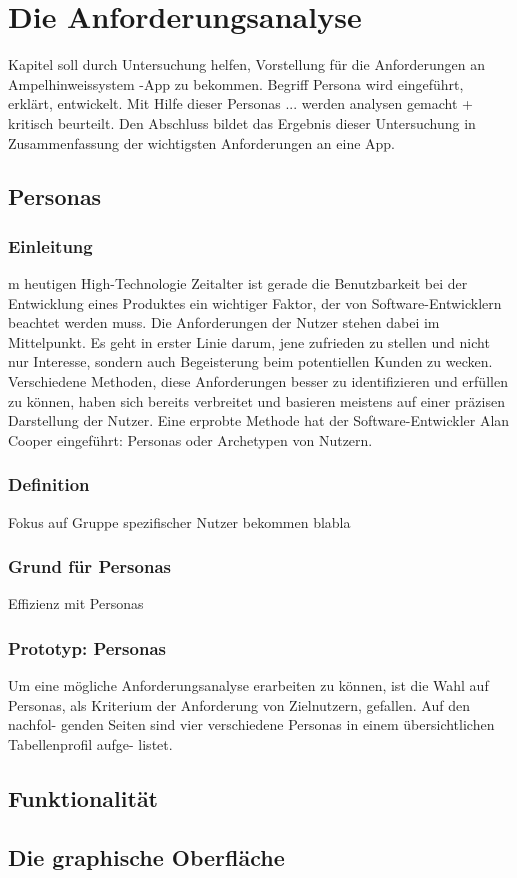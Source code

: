 \chapter{Die Anforderungsanalyse}
Kapitel soll durch Untersuchung helfen, Vorstellung für die Anforderungen an Ampelhinweissystem -App zu bekommen. Begriff Persona wird eingeführt, erklärt, entwickelt.
Mit Hilfe dieser Personas ... werden analysen gemacht + kritisch beurteilt.
Den Abschluss bildet das Ergebnis dieser Untersuchung in Zusammenfassung der wichtigsten Anforderungen an eine App.
\section{Personas}
\subsection{Einleitung}
m heutigen High-Technologie Zeitalter ist gerade die Benutzbarkeit bei der Entwicklung eines
Produktes ein wichtiger Faktor, der von Software-Entwicklern beachtet werden muss. Die Anforderungen der Nutzer stehen dabei im Mittelpunkt. Es geht in erster Linie darum, jene zufrieden zu stellen und nicht nur Interesse, sondern auch Begeisterung beim potentiellen Kunden zu wecken. Verschiedene Methoden, diese Anforderungen besser zu identifizieren und erfüllen zu können, haben sich bereits verbreitet und basieren meistens auf einer präzisen Darstellung der Nutzer. Eine erprobte Methode hat der Software-Entwickler Alan Cooper eingeführt: Personas oder Archetypen von Nutzern.
\subsection{Definition}
Fokus auf Gruppe spezifischer Nutzer bekommen blabla
\subsection{Grund für Personas}
Effizienz mit Personas
\subsection{Prototyp: Personas}
Um eine mögliche Anforderungsanalyse erarbeiten zu können, ist die
Wahl auf Personas, als Kriterium der Anforderung von Zielnutzern, gefallen. Auf den nachfol-
genden Seiten sind vier verschiedene Personas in einem übersichtlichen Tabellenprofil aufge-
listet.
\section{Funktionalität}
\section{Die graphische Oberfläche}
